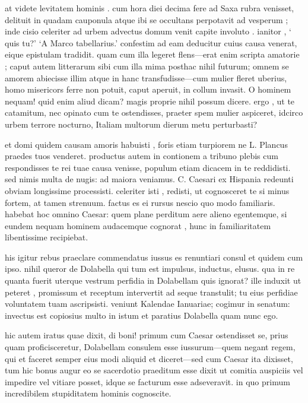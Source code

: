  at videte levitatem hominis . cum hora diei decima fere ad Saxa rubra venisset, delituit in quadam cauponula atque ibi se occultans perpotavit ad vesperum ; inde cisio celeriter ad urbem advectus domum venit capite involuto . ianitor , ` quis tu?' `A Marco tabellarius.' confestim ad eam deducitur cuius causa venerat, eique epistulam tradidit. quam cum illa legeret flens—erat enim scripta amatorie ; caput autem litterarum sibi cum illa mima posthac nihil futurum; omnem se amorem abiecisse illim atque in hanc transfudisse—cum mulier fleret uberius, homo misericors ferre non potuit, caput aperuit, in collum invasit. O hominem nequam! quid enim aliud dicam? magis proprie nihil possum dicere. ergo , ut te catamitum, nec opinato cum te ostendisses, praeter spem mulier aspiceret, idcirco urbem terrore nocturno, Italiam multorum dierum metu perturbasti?

 et domi quidem causam amoris habuisti , foris etiam turpiorem ne L. Plancus praedes tuos venderet. productus autem in contionem a tribuno plebis cum respondisses te rei tuae causa venisse, populum etiam dicacem in te reddidisti. sed nimis multa de nugis: ad maiora veniamus. C. Caesari ex Hispania redeunti obviam longissime processisti. celeriter isti , redisti, ut cognosceret te si minus fortem, at tamen strenuum. factus es ei rursus nescio quo modo familiaris. habebat hoc omnino Caesar: quem plane perditum aere alieno egentemque, si eundem nequam hominem audacemque cognorat , hunc in familiaritatem libentissime recipiebat.

 his igitur rebus praeclare commendatus iussus es renuntiari consul et quidem cum ipso. nihil queror de Dolabella qui tum est impulsus, inductus, elusus. qua in re quanta fuerit uterque vestrum perfidia in Dolabellam quis ignorat? ille induxit ut peteret , promissum et receptum intervertit ad seque transtulit; tu eius perfidiae voluntatem tuam ascripsisti. veniunt Kalendae Ianuariae; cogimur in senatum: invectus est copiosius multo in istum et paratius Dolabella quam nunc ego.

 hic autem iratus quae dixit, di boni! primum cum Caesar ostendisset se, prius quam proficisceretur, Dolabellam consulem esse iussurum—quem negant regem, qui et faceret semper eius modi aliquid et diceret—sed cum Caesar ita dixisset, tum hic bonus augur eo se sacerdotio praeditum esse dixit ut comitia auspiciis vel impedire vel vitiare posset, idque se facturum esse adseveravit. in quo primum incredibilem stupiditatem hominis cognoscite.

